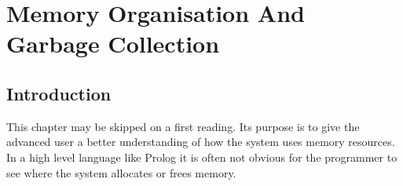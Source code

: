 %
% 
% 
% 
% 
%
%
%
%
%

\chapter{Memory Organisation And Garbage Collection}
\label{chapmemory}
\section{Introduction}
This chapter may be skipped on a first reading.
Its purpose is to give the advanced user a better understanding
of how the system uses memory resources.
In a high level language like Prolog it is often not obvious for the programmer
to see where the system allocates or frees memory.

